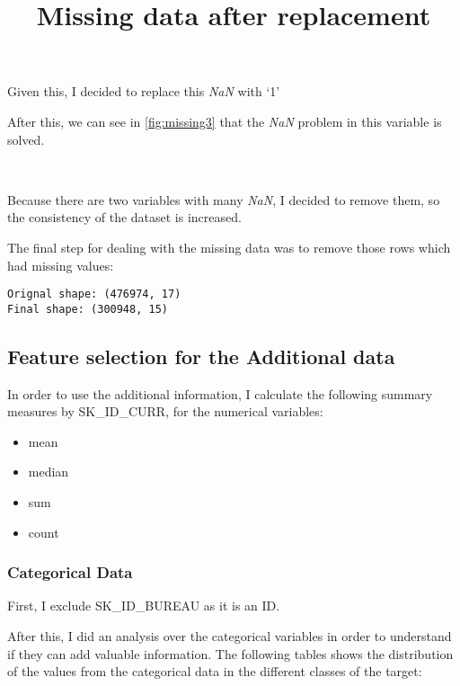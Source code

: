 \documentclass[11pt]{article}
\begin{document}
Given this, I decided to replace this \textit{NaN} with `1'

 After this, we can see in \ref{fig:missing3} that the \textit{NaN} problem in this variable is solved. 

            
    \begin{center}
    	\title{Missing data after replacement}
        \label{fig:missing3}
    \end{center}
    { \hspace*{\fill} \\}


Because there are two variables with many \textit{NaN}, I decided to remove them, so the consistency of the dataset is increased.

The final step for dealing with the missing data was to remove those rows which had missing values:

    \begin{Verbatim}[commandchars=\\\{\}]
Orignal shape: (476974, 17)
Final shape: (300948, 15)
\end{Verbatim}


\subsection{Feature selection for the Additional data}

            
In order to use the additional information, I calculate the following summary measures by SK\_ID\_CURR, for the numerical variables:

\begin{itemize}
	\item mean
	\item median
	\item sum
	\item count
\end{itemize}

 
 \subsubsection{Categorical Data}

First, I exclude SK\_ID\_BUREAU as it is an ID.

After this, I did an analysis over the categorical variables in order to understand
if they can add valuable information. The following tables shows the distribution of the values from the categorical data in the different classes of the target:
\end{document}
